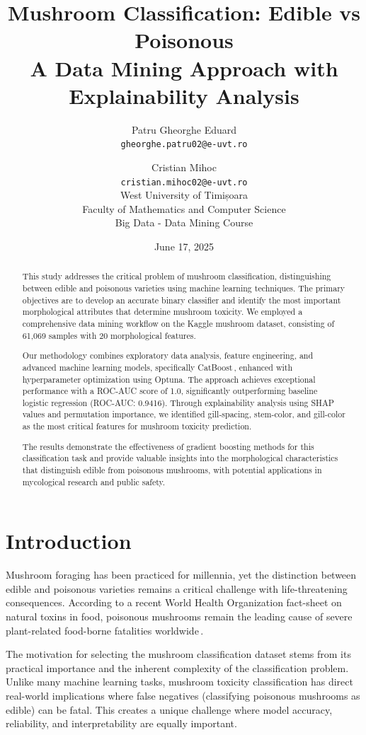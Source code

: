 \documentclass[11pt,a4paper]{article}
\title{\textbf{Mushroom Classification: Edible vs Poisonous}\\
       \large{A Data Mining Approach with Explainability Analysis}}
\author{
    Patru Gheorghe Eduard\\
    \texttt{gheorghe.patru02@e-uvt.ro}
    \and
    Cristian Mihoc\\
    \texttt{cristian.mihoc02@e-uvt.ro}\\[0.5em]
    \small{West University of Timișoara}\\
    \small{Faculty of Mathematics and Computer Science}\\
    \small{Big Data - Data Mining Course}
}
\date{June 17, 2025}
\begin{document}
\maketitle

\tableofcontents
\newpage

\begin{abstract}
This study addresses the critical problem of mushroom classification, distinguishing between edible and poisonous varieties using machine learning techniques. The primary objectives are to develop an accurate binary classifier and identify the most important morphological attributes that determine mushroom toxicity. We employed a comprehensive data mining workflow on the Kaggle mushroom dataset, consisting of 61,069 samples with 20 morphological features.

Our methodology combines exploratory data analysis, feature engineering, and advanced machine learning models, specifically CatBoost\,\cite{prokhorenkova2018catboost}, enhanced with hyperparameter optimization using Optuna. The approach achieves exceptional performance with a ROC-AUC score of 1.0, significantly outperforming baseline logistic regression (ROC-AUC: 0.9416). Through explainability analysis using SHAP values and permutation importance, we identified gill-spacing, stem-color, and gill-color as the most critical features for mushroom toxicity prediction.

The results demonstrate the effectiveness of gradient boosting methods for this classification task and provide valuable insights into the morphological characteristics that distinguish edible from poisonous mushrooms, with potential applications in mycological research and public safety.
\end{abstract}

\section{Introduction}

Mushroom foraging has been practiced for millennia, yet the distinction between edible and poisonous varieties remains a critical challenge with life-threatening consequences. According to a recent World Health Organization fact-sheet on natural toxins in food,
poisonous mushrooms remain the leading cause of severe plant-related food-borne
fatalities worldwide\,\cite{who2023naturaltoxins}.

The motivation for selecting the mushroom classification dataset stems from its practical importance and the inherent complexity of the classification problem. Unlike many machine learning tasks, mushroom toxicity classification has direct real-world implications where false negatives (classifying poisonous mushrooms as edible) can be fatal. This creates a unique challenge where model accuracy, reliability, and interpretability are equally important.
\end{document}
